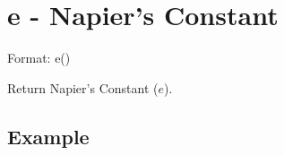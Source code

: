 
%

\section{e - Napier’s Constant\label{sect:e}}

Format: e()

Return Napier’s Constant ($e$).

\subsection*{Example}


%

